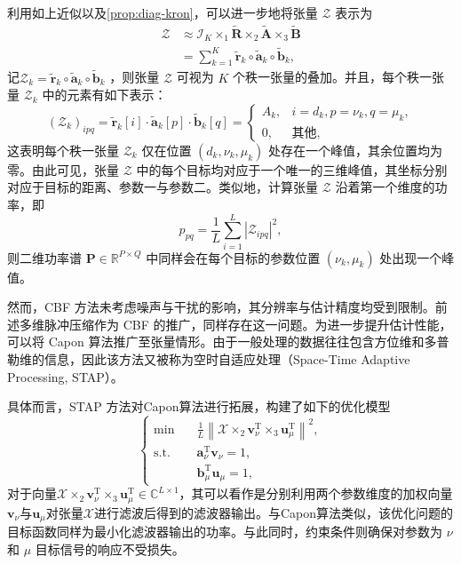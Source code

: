 利用如上近似以及\cref{prop:diag-kron}，可以进一步地将张量 \( \mathcal{Z} \) 表示为
\[
    \begin{split}
        \mathcal{Z}
         & \approx \mathcal{I}_K \times_1 \tilde{\mathbf{R}} \times_2 \tilde{\mathbf{A}} \times_3 \tilde{\mathbf{B}} \\
         & = \sum_{k=1}^K \tilde{\bm{r}}_k \circ \tilde{\bm{a}}_k \circ \tilde{\bm{b}}_k,
    \end{split}
\]
记\( \mathcal{Z}_k = \tilde{\bm{r}}_k \circ \tilde{\bm{a}}_k \circ \tilde{\bm{b}}_k \) ，则张量 \( \mathcal{Z} \) 可视为 \( K \) 个秩一张量的叠加。并且，每个秩一张量 \( \mathcal{Z}_k \) 中的元素有如下表示：
\[
    (\mathcal{Z}_k)_{ipq} =  \tilde{\bm{r}}_k[i] \cdot \tilde{\bm{a}}_k[p] \cdot \tilde{\bm{b}}_k[q] = \begin{cases}
        A_k, & i = d_k, p = \nu_k, q = \mu_k, \\
        0,   & \text{其他},
    \end{cases}
\]
这表明每个秩一张量 \( \mathcal{Z}_k \) 仅在位置 \( (d_k, \nu_k, \mu_k) \) 处存在一个峰值，其余位置均为零。由此可见，张量 \( \mathcal{Z} \) 中的每个目标均对应于一个唯一的三维峰值，其坐标分别对应于目标的距离、参数一与参数二。类似地，计算张量 \( \mathcal{Z} \) 沿着第一个维度的功率，即
\[
    p_{pq} = \frac{1}{L} \sum_{i=1}^L |\mathcal{Z}_{ipq}|^2,
\]
则二维功率谱 \( \mathbf{P} \in \mathbb{R}^{P \times Q} \) 中同样会在每个目标的参数位置 \( (\nu_k, \mu_k) \) 处出现一个峰值。

然而，CBF 方法未考虑噪声与干扰的影响，其分辨率与估计精度均受到限制。前述多维脉冲压缩作为 CBF 的推广，同样存在这一问题。为进一步提升估计性能，可以将 Capon 算法推广至张量情形。由于一般处理的数据往往包含方位维和多普勒维的信息，因此该方法又被称为空时自适应处理（Space-Time Adaptive Processing, STAP）。

具体而言，STAP 方法对Capon算法进行拓展，构建了如下的优化模型
\[
    \begin{cases}
        \min \quad        & \frac{1}{L} \left\| \mathcal{X} \times_2 \bm{v}_{\nu}^{\mathrm{T}} \times_3 \bm{u}_{\mu}^{\mathrm{T}} \right\|^2, \\
        \text{s.t.} \quad & \bm{a}^{\mathrm{T}}_{\nu} \bm{v}_{\nu} = 1,                                                                       \\
                          & \bm{b}^{\mathrm{T}}_{\mu} \bm{u}_{\mu} = 1,
    \end{cases}
\]
对于向量\( \mathcal{X} \times_2 \bm{v}_{\nu}^{\mathrm{T}} \times_3 \bm{u}_{\mu}^{\mathrm{T}} \in \mathbb{C}^{L \times 1} \)，其可以看作是分别利用两个参数维度的加权向量\( \bm{v}_{\nu} \)与\( \bm{u}_{\mu} \)对张量\( \mathcal{X} \)进行滤波后得到的滤波器输出。与Capon算法类似，该优化问题的目标函数同样为最小化滤波器输出的功率。与此同时，约束条件则确保对参数为 \( \nu \) 和 \( \mu \) 目标信号的响应不受损失。

